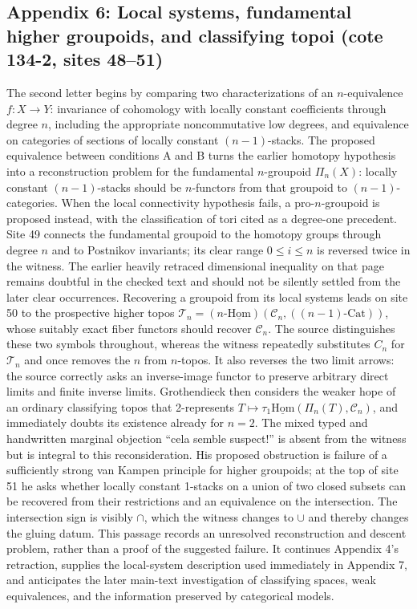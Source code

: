 \subsection*{Appendix 6: Local systems, fundamental higher groupoids, and classifying topoi (cote 134-2, sites 48--51)}
The second letter begins by comparing two characterizations of an $n$-equivalence $f:X\to Y$: invariance of cohomology with locally constant coefficients through degree $n$, including the appropriate noncommutative low degrees, and equivalence on categories of sections of locally constant $(n-1)$-stacks. The proposed equivalence between conditions A and B turns the earlier homotopy hypothesis into a reconstruction problem for the fundamental $n$-groupoid $\Pi_n(X)$: locally constant $(n-1)$-stacks should be $n$-functors from that groupoid to $(n-1)$-categories. When the local connectivity hypothesis fails, a pro-$n$-groupoid is proposed instead, with the classification of tori cited as a degree-one precedent. Site 49 connects the fundamental groupoid to the homotopy groups through degree $n$ and to Postnikov invariants; its clear range $0\leq i\leq n$ is reversed twice in the witness. The earlier heavily retraced dimensional inequality on that page remains doubtful in the checked text and should not be silently settled from the later clear occurrences. Recovering a groupoid from its local systems leads on site 50 to the prospective higher topos $\mathcal T_n=(n\text{-}\underline{\mathrm{Hom}})(\mathcal C_n,((n-1)\text{-Cat}))$, whose suitably exact fiber functors should recover $\mathcal C_n$. The source distinguishes these two symbols throughout, whereas the witness repeatedly substitutes $C_n$ for $\mathcal T_n$ and once removes the $n$ from $n$-topos. It also reverses the two limit arrows: the source correctly asks an inverse-image functor to preserve arbitrary direct limits and finite inverse limits. Grothendieck then considers the weaker hope of an ordinary classifying topos that 2-represents $T\mapsto\tau_1\underline{\mathrm{Hom}}(\Pi_n(T),\mathcal C_n)$, and immediately doubts its existence already for $n=2$. The mixed typed and handwritten marginal objection ``cela semble suspect!'' is absent from the witness but is integral to this reconsideration. His proposed obstruction is failure of a sufficiently strong van Kampen principle for higher groupoids; at the top of site 51 he asks whether locally constant 1-stacks on a union of two closed subsets can be recovered from their restrictions and an equivalence on the intersection. The intersection sign is visibly $\cap$, which the witness changes to $\cup$ and thereby changes the gluing datum. This passage records an unresolved reconstruction and descent problem, rather than a proof of the suggested failure. It continues Appendix 4's retraction, supplies the local-system description used immediately in Appendix 7, and anticipates the later main-text investigation of classifying spaces, weak equivalences, and the information preserved by categorical models.
